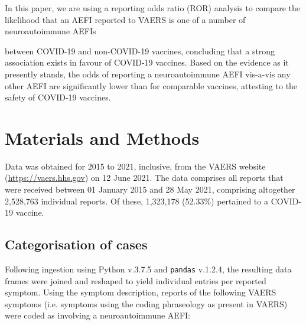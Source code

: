 \documentclass[idr,communication,submit,oneauthor,pdftex]{Definitions/mdpi}
\begin{document}
In this paper, we are using a reporting odds ratio (ROR) 
analysis\cite{rothman2004reporting} to compare the likelihood
that an AEFI reported to VAERS is one of a number of neuroautoimmune AEFIs 

between COVID-19 and non-COVID-19 vaccines, concluding that a strong 
association exists in favour of COVID-19 vaccines. Based on the evidence 
as it presently stands, the odds of reporting a neuroautoimmune AEFI 
vis-a-vis any other AEFI are significantly lower than for comparable 
vaccines, attesting to the safety of COVID-19 vaccines.

\section{Materials and Methods}

Data was obtained for 2015 to 2021, inclusive, from the VAERS website (\url{https://vaers.hhs.gov}) on 12 June 2021.
The data comprises all reports that were received between 01 January 2015 and 28 May 2021, comprising altogether 2,528,763 individual reports. Of these, 1,323,178 (52.33\%) pertained to a COVID-19 vaccine.

\subsection{Categorisation of cases}

Following ingestion using Python v.3.7.5 and \texttt{pandas} v.1.2.4,\cite{mckinney2011pandas} the resulting data
frames were joined and reshaped to yield individual entries per reported symptom. Using the symptom description,
reports of the following VAERS symptoms (i.e. symptoms using the coding phraseology as present in VAERS) were coded as
involving a neuroautoimmune AEFI:
\end{document}
